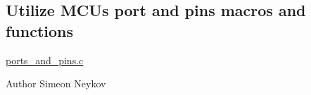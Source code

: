\subsection*{Utilize M\+C\+Us port and pins macros and functions}

\mbox{\hyperlink{ports__and__pins_8c}{ports\+\_\+and\+\_\+pins.\+c}}

\begin{DoxyAuthor}{Author}
Simeon Neykov 
\end{DoxyAuthor}
